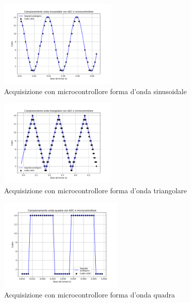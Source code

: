 \documentclass[journal]{IEEEtran}
\begin{document}
\begin{figure}[H]%
\begin{center}
\includegraphics[trim = {0 25 0 0},clip, width=0.50\textwidth]{analysis/output/mcu_sine.pdf}
\caption{Acquisizione con microcontrollore forma d'onda sinusoidale}
\label{fig:mcu_sine}
\end{center}
\end{figure}

\begin{figure}[H]%
\begin{center}
\includegraphics[trim = {0 25 0 0},clip, width=0.50\textwidth]{analysis/output/mcu_triangle.pdf}
\caption{Acquisizione con microcontrollore forma d'onda triangolare}
\label{fig:mcu_triang}
\end{center}
\end{figure}

\begin{figure}[H]%
\begin{center}
\includegraphics[trim = {0 25 0 0},clip, width=0.53\textwidth]{analysis/output/mcu_square.pdf}
\caption{Acquisizione con microcontrollore forma d'onda quadra}
\label{fig:mcu_triang}
\end{center}
\end{figure}
\end{document}
